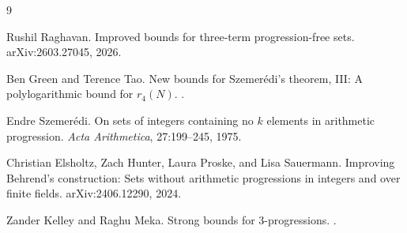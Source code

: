 \documentclass[11pt]{article}
\begin{document}
\begin{thebibliography}{9}

Rushil Raghavan.
\newblock Improved bounds for three-term progression-free sets.
\newblock arXiv:2603.27045, 2026.

Ben Green and Terence Tao.
\newblock New bounds for Szemerédi's theorem, III: A polylogarithmic bound for
\(r_4(N)\).
.

Endre Szemerédi.
\newblock On sets of integers containing no \(k\) elements in arithmetic progression.
\newblock \emph{Acta Arithmetica}, 27:199--245, 1975.

Christian Elsholtz, Zach Hunter, Laura Proske, and Lisa Sauermann.
\newblock Improving Behrend's construction: Sets without arithmetic progressions
in integers and over finite fields.
\newblock arXiv:2406.12290, 2024.

Zander Kelley and Raghu Meka.
\newblock Strong bounds for 3-progressions.
.

\end{thebibliography}
\end{document}
